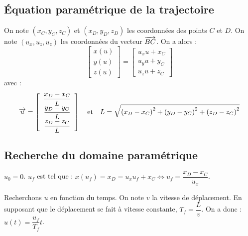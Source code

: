 \documentclass[10pt,fleqn]{article} %
\begin{document}
\subsection{Équation paramétrique de la trajectoire}
On note $\left(x_C, y_C, z_C\right)$ et $\left(x_D,y_D,z_D\right)$ les coordonnées des points $C$ et $D$. 
On note $\left(u_x, u_z, u_z\right)$ les coordonnées du vecteur $\overrightarrow{BC}$.
On a alors :
$$
\left[ \begin{array}{c} x(u) \\ y(u) \\ z(u) \end{array} \right]
= \left[ \begin{array} {c} u_x u  + x_C \\ u_y u  + y_C  \\ u_z u  + z_C  \end{array} \right]
$$
avec :
$$
\overrightarrow{u}
= \left[ \begin{array} {c} \dfrac{x_D - x_C}{L} \\ \dfrac{y_D - y_C}{L} \\ \dfrac{z_D - z_C}{L} \end{array} \right]
\quad \text{et} \quad L = \sqrt{\left( x_D - x_C\right) ^2+\left( y_D - y_C\right) ^2+\left( z_D - z_C\right) ^2}
$$

\subsection*{Recherche du domaine paramétrique}
$u_0 =0$. $u_f$ est tel que : $x(u_f)=x_D= u_x u_f  + x_C \Leftrightarrow u_f = \dfrac{x_D-x_C}{u_x}$.

Recherchons $u$ en fonction du temps. On note $v$ la vitesse de déplacement. En supposant que le déplacement se fait à vitesse constante, $T_f = \dfrac{L}{v}$.
On a donc : $u(t)= \dfrac{u_f}{T_f} t$.




\end{document}
